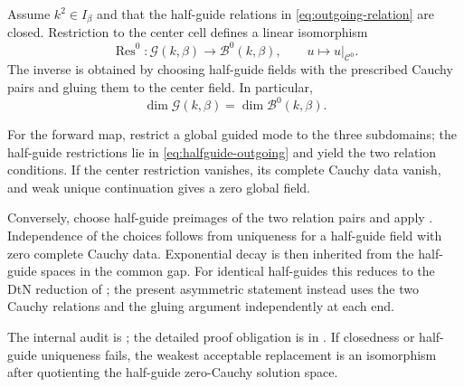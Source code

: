 \begin{theorem}
\label{thm:bounded-reduction}
Assume $k^2\in I_\beta$ and that the half-guide relations in
\eqref{eq:outgoing-relation} are closed.  Restriction to the center cell defines
a linear isomorphism
\begin{equation}
  \operatorname{Res}^0:\mathcal G(k,\beta)
  \longrightarrow\mathcal B^0(k,\beta),
  \qquad u\longmapsto u|_{\mathcal C^0}.
  \label{eq:restriction-isomorphism}
\end{equation}
The inverse is obtained by choosing half-guide fields with the prescribed
Cauchy pairs and gluing them to the center field.  In particular,
\begin{equation}
  \dim\mathcal G(k,\beta)=\dim\mathcal B^0(k,\beta).
  \label{eq:bounded-multiplicity}
\end{equation}
\end{theorem}
\begin{proofroadmap}
For the forward map, restrict a global guided mode to the three subdomains;
the half-guide restrictions lie in \eqref{eq:halfguide-outgoing} and yield the two
relation conditions.  If the center restriction vanishes, its complete Cauchy
data vanish, and weak unique continuation gives a zero global field.

Conversely, choose half-guide preimages of the two relation pairs and apply
.  Independence of the choices follows from uniqueness
for a half-guide field with zero complete Cauchy data.  Exponential decay is
then inherited from the half-guide spaces in the common gap.  For identical
half-guides this reduces to the DtN reduction of
\cite[Theorem~4.5]{Fliss2013}; the present asymmetric statement instead uses
the two Cauchy relations and the gluing argument independently at each end.

The internal audit is
;
the detailed proof obligation is in
.  If closedness
or half-guide uniqueness fails, the weakest acceptable replacement is an
isomorphism after quotienting the half-guide zero-Cauchy solution space.
\end{proofroadmap}
